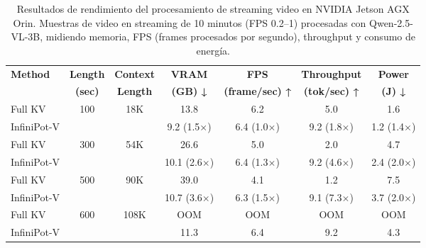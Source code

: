 \begin{table}[t]
\small
\centering
\begin{tabular}{l c c c c c c}
\toprule
\textbf{Method} & \textbf{Length} & \textbf{Context} &
\textbf{VRAM} & \textbf{FPS} & \textbf{Throughput} & \textbf{Power} \\
 & \textbf{(sec)} & \textbf{Length} &
\textbf{(GB) ↓} & \textbf{(frame/sec) ↑} & \textbf{(tok/sec) ↑} & \textbf{(J) ↓} \\
\midrule
Full KV & 100 & 18K & 13.8 & 6.2 & 5.0 & 1.6 \\
InfiniPot-V    &     &     & 9.2 (1.5$\times$) & 6.4 (1.0$\times$) & 9.2 (1.8$\times$) & 1.2 (1.4$\times$) \\ \midrule
Full KV & 300 & 54K & 26.6 & 5.0 & 2.0 & 4.7 \\
InfiniPot-V    &     &     & 10.1 (2.6$\times$) & 6.4 (1.3$\times$) & 9.2 (4.6$\times$) & 2.4 (2.0$\times$) \\ \midrule
Full KV & 500 & 90K & 39.0 & 4.1 & 1.2 & 7.5 \\
InfiniPot-V    &     &     & 10.7 (3.6$\times$) & 6.3 (1.5$\times$) & 9.1 (7.3$\times$) & 3.7 (2.0$\times$) \\ \midrule
Full KV & 600 & 108K & OOM & OOM & OOM & OOM \\
InfiniPot-V    &      &      & 11.3 & 6.4 & 9.2 & 4.3 \\
\bottomrule
\end{tabular}
\vspace{.1in}
\caption{Resultados de rendimiento del procesamiento de streaming video en NVIDIA Jetson AGX Orin. Muestras de video en streaming de 10 minutos (FPS 0.2--1) procesadas con Qwen-2.5-VL-3B, midiendo memoria, FPS (frames procesados por segundo), throughput y consumo de energía.}
\label{tab:jetson}
\vspace{-.2in}
\end{table}
